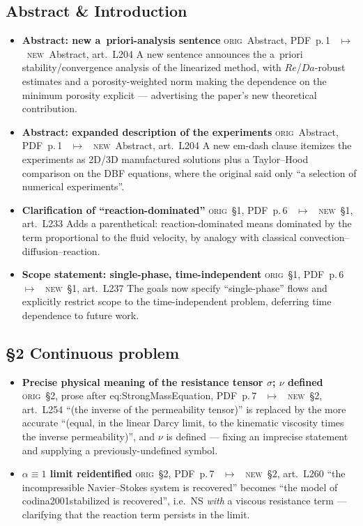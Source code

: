 \documentclass[11pt]{article}
\newcommand{\Orig}{\textcolor{origc}{\footnotesize\textsc{orig}}}
\newcommand{\New}{\textcolor{newc}{\footnotesize\textsc{new}}}
\newcommand{\code}[1]{\textcolor{newc}{\ttfamily\small #1}}
\newcommand{\pdfp}[1]{PDF~p.\,#1}
\newcommand{\artl}[1]{art.\ L#1}       %
\newcommand{\ch}[4]{%
  \item \textbf{#1}\newline
    {\footnotesize\Orig\ #2 \ \textcolor{locc}{$\longmapsto$} \ \New\ #3}\newline
    #4}
\begin{document}
\subsection{Abstract \& Introduction}
\begin{itemize}
\ch{Abstract: new a~priori-analysis sentence}
   {Abstract, \pdfp{1}}
   {Abstract, \artl{204}}
   {A new sentence announces the a~priori stability/convergence analysis of the linearized method,
    with $Re$/$Da$-robust estimates and a porosity-weighted norm making the dependence on the minimum
    porosity explicit --- advertising the paper's new theoretical contribution.}
\ch{Abstract: expanded description of the experiments}
   {Abstract, \pdfp{1}}
   {Abstract, \artl{204}}
   {A new em-dash clause itemizes the experiments as 2D/3D manufactured solutions plus a Taylor--Hood
    comparison on the DBF equations, where the original said only ``a selection of numerical
    experiments''.}
\ch{Clarification of ``reaction-dominated''}
   {\S1, \pdfp{6}}
   {\S1, \artl{233}}
   {Adds a parenthetical: reaction-dominated means dominated by the term proportional to the fluid
    velocity, by analogy with classical convection--diffusion--reaction.}
\ch{Scope statement: single-phase, time-independent}
   {\S1, \pdfp{6}}
   {\S1, \artl{237}}
   {The goals now specify ``single-phase'' flows and explicitly restrict scope to the
    time-independent problem, deferring time dependence to future work.}
\end{itemize}

\subsection{\S2 Continuous problem}
\begin{itemize}
\ch{Precise physical meaning of the resistance tensor $\sigma$; $\nu$ defined}
   {\S2, prose after \code{eq:StrongMassEquation}, \pdfp{7}}
   {\S2, \artl{254}}
   {``(the inverse of the permeability tensor)'' is replaced by the more accurate ``(equal, in the
    linear Darcy limit, to the kinematic viscosity times the inverse permeability)'', and $\nu$ is
    defined --- fixing an imprecise statement and supplying a previously-undefined symbol.}
\ch{$\alpha\equiv1$ limit reidentified}
   {\S2, \pdfp{7}}
   {\S2, \artl{260}}
   {``the incompressible Navier--Stokes system is recovered'' becomes ``the model of
    \code{codina2001stabilized} is recovered'', i.e.\ NS \emph{with} a viscous resistance term
    --- clarifying that the reaction term persists in the limit.}
\end{itemize}
\end{document}

